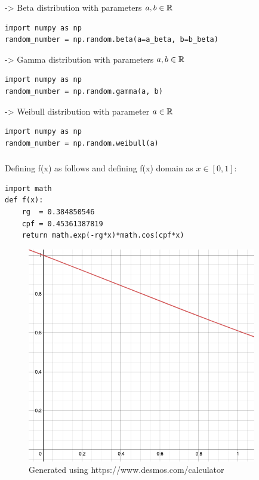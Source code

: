 \documentclass{homework}
\begin{document}
-> Beta distribution with parameters $a, b \in \mathbb R$

\begin{lstlisting}
import numpy as np
random_number = np.random.beta(a=a_beta, b=b_beta)
\end{lstlisting}

-> Gamma distribution with parameters $a, b \in \mathbb R$

\begin{lstlisting}
import numpy as np
random_number = np.random.gamma(a, b)
\end{lstlisting}

-> Weibull distribution with parameter $a \in \mathbb R$

\begin{lstlisting}
import numpy as np
random_number = np.random.weibull(a)
\end{lstlisting}

\subsubsection{}
Defining f(x) as follows and defining f(x) domain as $x \in [0, 1]$:

\begin{lstlisting}
import math
def f(x):
    rg  = 0.384850546
	cpf = 0.45361387819
	return math.exp(-rg*x)*math.cos(cpf*x)
\end{lstlisting}

\begin{figure}[htp]
    \centering
    \includegraphics[width=10cm]{Screen Shot 2021-05-16 at 17.28.17}
    \caption{Generated using https://www.desmos.com/calculator}
\end{figure}
\end{document}
